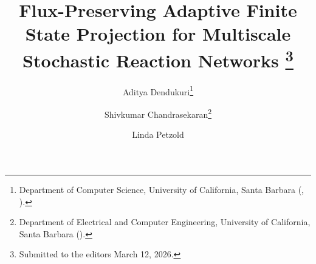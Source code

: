 

\usepackage{amsfonts}
\usepackage{graphicx}
\usepackage{epstopdf}
\usepackage{algorithmic}
\ifpdf
\else
\fi

\newcommand{\creflastconjunction}{, and~}





\title{Flux-Preserving Adaptive Finite State Projection for Multiscale Stochastic Reaction Networks
\thanks{Submitted to the editors March 12, 2026.}}

\author{Aditya Dendukuri\thanks{Department of Computer Science, University of California, Santa Barbara
  (, ).}
\and Shivkumar Chandrasekaran\thanks{Department of Electrical and Computer Engineering, University of California, Santa Barbara 
  ().}
\and Linda Petzold\footnotemark[2]}


\usepackage{amsopn}
\DeclareMathOperator{\diag}{diag}


\makeatletter
\newcommand*{\addFileDependency}[1]{%
  \typeout{(#1)}%
  \@addtofilelist{#1}%
  \IfFileExists{#1}{}{\typeout{No file #1.}}%
}
\makeatother

